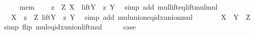 \begin{isabellebody}
\ \ \isamarkupfalse%
\ \isamarkupfalse%
\ mem\ \isamarkupfalse%
\ {\isachardoublequoteopen}{\isachardot}{\kern0pt}{\isachardot}{\kern0pt}{\isachardot}{\kern0pt}\ {\isacharequal}{\kern0pt}\ {\isacharparenleft}{\kern0pt}{\isasymUnion}z\ {\isasymin}\ Z{\isachardot}{\kern0pt}\ X\ {\isacharasterisk}{\kern0pt}\ lift{\isacharparenleft}{\kern0pt}Y\ {\isacharasterisk}{\kern0pt}\ z{\isacharparenright}{\kern0pt}\ Y{\isacharparenright}{\kern0pt}{\isachardoublequoteclose}\ \isamarkupfalse%
\ {\isacharparenleft}{\kern0pt}simp\ add{\isacharcolon}{\kern0pt}\ mul{\isacharunderscore}{\kern0pt}lift{\isacharunderscore}{\kern0pt}eq{\isacharunderscore}{\kern0pt}lift{\isacharunderscore}{\kern0pt}mul{\isacharunderscore}{\kern0pt}mul{\isacharparenright}{\kern0pt}\isanewline
\ \ \isamarkupfalse%
\ \isamarkupfalse%
\ {\isachardoublequoteopen}{\isachardot}{\kern0pt}{\isachardot}{\kern0pt}{\isachardot}{\kern0pt}\ {\isacharequal}{\kern0pt}\ X\ {\isacharasterisk}{\kern0pt}\ {\isacharparenleft}{\kern0pt}{\isasymUnion}z\ {\isasymin}\ Z{\isachardot}{\kern0pt}\ lift{\isacharparenleft}{\kern0pt}Y\ {\isacharasterisk}{\kern0pt}\ z{\isacharparenright}{\kern0pt}\ Y{\isacharparenright}{\kern0pt}{\isachardoublequoteclose}\ \isamarkupfalse%
\ {\isacharparenleft}{\kern0pt}simp\ add{\isacharcolon}{\kern0pt}\ mul{\isacharunderscore}{\kern0pt}union{\isacharunderscore}{\kern0pt}eq{\isacharunderscore}{\kern0pt}idx{\isacharunderscore}{\kern0pt}union{\isacharunderscore}{\kern0pt}mul{\isacharparenright}{\kern0pt}\isanewline
\ \ \isamarkupfalse%
\ \isamarkupfalse%
\ {\isachardoublequoteopen}{\isachardot}{\kern0pt}{\isachardot}{\kern0pt}{\isachardot}{\kern0pt}\ {\isacharequal}{\kern0pt}\ X\ {\isacharasterisk}{\kern0pt}\ {\isacharparenleft}{\kern0pt}Y\ {\isacharasterisk}{\kern0pt}\ Z{\isacharparenright}{\kern0pt}{\isachardoublequoteclose}\ \isamarkupfalse%
\ {\isacharparenleft}{\kern0pt}simp\ flip{\isacharcolon}{\kern0pt}\ mul{\isacharunderscore}{\kern0pt}eq{\isacharunderscore}{\kern0pt}idx{\isacharunderscore}{\kern0pt}union{\isacharunderscore}{\kern0pt}lift{\isacharunderscore}{\kern0pt}mul{\isacharparenright}{\kern0pt}\isanewline
\ \ \isamarkupfalse%
\ \isamarkupfalse%
\ {\isacharquery}{\kern0pt}case\ \isacommand{{\isachardot}{\kern0pt}}\isamarkupfalse%
\isanewline
{}\isamarkupfalse%
%
\endisatagproof
{\isafoldproof}%
%
\isadelimproof
%
\endisadelimproof
%
\isadelimdocument
%
\endisadelimdocument

\end{isabellebody}
